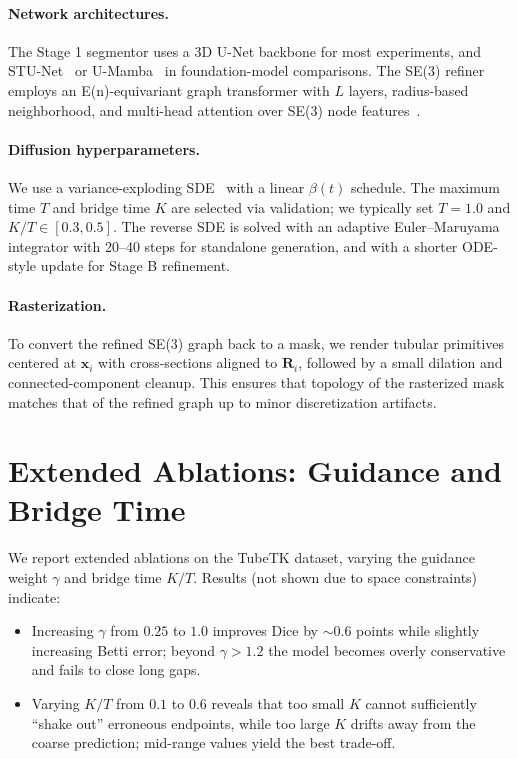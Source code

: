 \documentclass{article}
\begin{document}
\paragraph{Network architectures.}
The Stage 1 segmentor uses a 3D U-Net backbone for most experiments, and STU-Net~\cite{huang2024stu} or U-Mamba~\cite{ma2024umamba} in foundation-model comparisons. The SE(3) refiner employs an E(n)-equivariant graph transformer with $L$ layers, radius-based neighborhood, and multi-head attention over SE(3) node features~\cite{satorras2021n,liao2024equiformer}.

\paragraph{Diffusion hyperparameters.}
We use a variance-exploding SDE~\cite{song2021score} with a linear $\beta(t)$ schedule. The maximum time $T$ and bridge time $K$ are selected via validation; we typically set $T = 1.0$ and $K/T \in [0.3, 0.5]$. The reverse SDE is solved with an adaptive Euler--Maruyama integrator with 20--40 steps for standalone generation, and with a shorter ODE-style update for Stage B refinement.

\paragraph{Rasterization.}
To convert the refined SE(3) graph back to a mask, we render tubular primitives centered at $\mathbf{x}_i$ with cross-sections aligned to $\mathbf{R}_i$, followed by a small dilation and connected-component cleanup. This ensures that topology of the rasterized mask matches that of the refined graph up to minor discretization artifacts.

\section{Extended Ablations: Guidance and Bridge Time}
\label{sec:appendix_ablation}

We report extended ablations on the TubeTK dataset, varying the guidance weight $\gamma$ and bridge time $K/T$. Results (not shown due to space constraints) indicate:

\begin{itemize}[leftmargin=*]
  \item Increasing $\gamma$ from $0.25$ to $1.0$ improves Dice by $\sim 0.6$ points while slightly increasing Betti error; beyond $\gamma > 1.2$ the model becomes overly conservative and fails to close long gaps.
  \item Varying $K/T$ from $0.1$ to $0.6$ reveals that too small $K$ cannot sufficiently ``shake out'' erroneous endpoints, while too large $K$ drifts away from the coarse prediction; mid-range values yield the best trade-off.
\end{itemize}
\end{document}
